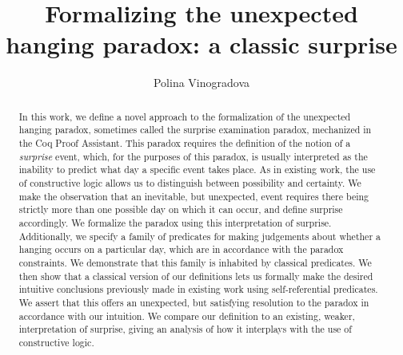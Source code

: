 \documentclass[runningheads]{llncs}
\begin{document}
%
\title{Formalizing the unexpected hanging paradox: a classic surprise} %
%
%
\author{Polina Vinogradova }
%
%
%
\maketitle              %
%
\begin{abstract}

  In this work, we define a novel approach to the formalization of the
  unexpected hanging paradox, sometimes called the surprise examination paradox,
  mechanized in the Coq Proof Assistant.
  This paradox requires the definition of the notion of
  a \emph{surprise} event, which, for the purposes of this paradox, is usually interpreted as
  the inability to predict what day a specific event takes place. As in existing work,
  the use of constructive logic allows us to distinguish between possibility and
  certainty.
  We make the observation that an inevitable, but unexpected, event requires there being strictly
  more than one possible day on which it can occur, and define surprise accordingly. We
  formalize the paradox using this interpretation of surprise. Additionally, we
  specify a family of
  predicates for making judgements about whether a hanging occurs on a particular day,
  which are in accordance with the paradox constraints.
  We demonstrate that this family is inhabited by classical predicates.
  We then show that a classical version of our definitions lets us formally make the desired intuitive
  conclusions previously made in existing work using self-referential predicates.
  We assert that this offers an unexpected, but satisfying resolution to the paradox in accordance with
  our intuition.
  We compare our definition to an existing, weaker, interpretation of surprise,
  giving an analysis of how it interplays with the use of constructive logic.

\end{abstract}
%
\end{document}
